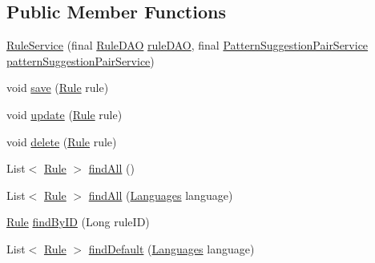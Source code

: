 \subsection*{Public Member Functions}
\begin{DoxyCompactItemize}
\item 
\hyperlink{classbr_1_1usp_1_1cata_1_1service_1_1_rule_service_a8ddeacb11610241d1bbbf855e73a9d9d}{Rule\+Service} (final \hyperlink{classbr_1_1usp_1_1cata_1_1dao_1_1_rule_d_a_o}{Rule\+D\+A\+O} \hyperlink{classbr_1_1usp_1_1cata_1_1service_1_1_rule_service_aa3af0042eda8e23666ba9b97bc414dab}{rule\+D\+A\+O}, final \hyperlink{classbr_1_1usp_1_1cata_1_1service_1_1_pattern_suggestion_pair_service}{Pattern\+Suggestion\+Pair\+Service} \hyperlink{classbr_1_1usp_1_1cata_1_1service_1_1_rule_service_a34b6dc002357b8d5f00e47f891a4cf6d}{pattern\+Suggestion\+Pair\+Service})
\item 
void \hyperlink{classbr_1_1usp_1_1cata_1_1service_1_1_rule_service_a5e0dd9bd09116a994adab45fcbf46b81}{save} (\hyperlink{classbr_1_1usp_1_1cata_1_1model_1_1_rule}{Rule} rule)
\item 
void \hyperlink{classbr_1_1usp_1_1cata_1_1service_1_1_rule_service_a5eabe087a5accd726b4d6458451b8e03}{update} (\hyperlink{classbr_1_1usp_1_1cata_1_1model_1_1_rule}{Rule} rule)
\item 
void \hyperlink{classbr_1_1usp_1_1cata_1_1service_1_1_rule_service_a06c2d7419ac4531f26c5cbadc145f1a9}{delete} (\hyperlink{classbr_1_1usp_1_1cata_1_1model_1_1_rule}{Rule} rule)
\item 
List$<$ \hyperlink{classbr_1_1usp_1_1cata_1_1model_1_1_rule}{Rule} $>$ \hyperlink{classbr_1_1usp_1_1cata_1_1service_1_1_rule_service_a99cbe04e5d06ccbbc5ec056f227bd6f5}{find\+All} ()
\item 
List$<$ \hyperlink{classbr_1_1usp_1_1cata_1_1model_1_1_rule}{Rule} $>$ \hyperlink{classbr_1_1usp_1_1cata_1_1service_1_1_rule_service_ac590f3fc86ef7181c546316ff725b691}{find\+All} (\hyperlink{enumbr_1_1usp_1_1cata_1_1model_1_1_languages}{Languages} language)
\item 
\hyperlink{classbr_1_1usp_1_1cata_1_1model_1_1_rule}{Rule} \hyperlink{classbr_1_1usp_1_1cata_1_1service_1_1_rule_service_abff85270a64dda0ac88ab8325d75da80}{find\+By\+I\+D} (Long rule\+I\+D)
\item 
List$<$ \hyperlink{classbr_1_1usp_1_1cata_1_1model_1_1_rule}{Rule} $>$ \hyperlink{classbr_1_1usp_1_1cata_1_1service_1_1_rule_service_a592eff157a59bf6f0e5bf7c542a11fc2}{find\+Default} (\hyperlink{enumbr_1_1usp_1_1cata_1_1model_1_1_languages}{Languages} language)

\end{DoxyCompactItemize}
